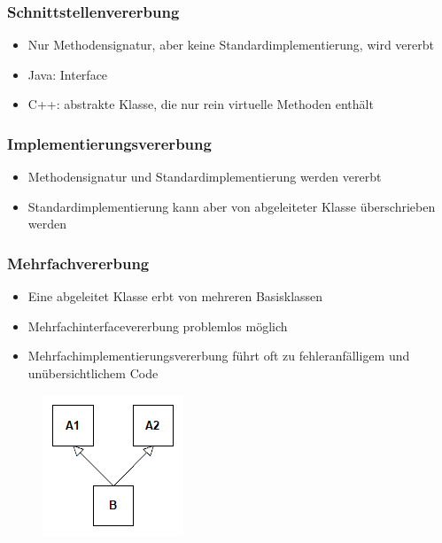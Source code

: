 \begin{frame}
	\frametitle{Schnittstellenvererbung}
	\begin{itemize}
		\item Nur Methodensignatur, aber keine Standardimplementierung, wird vererbt
		\item Java: Interface
		\item C++: abstrakte Klasse, die nur rein virtuelle Methoden enthält
	\end{itemize}
\end{frame}


\begin{frame}
	\frametitle{Implementierungsvererbung}
	\begin{itemize}
		\item Methodensignatur und Standardimplementierung werden vererbt
		\item Standardimplementierung kann aber von abgeleiteter Klasse überschrieben werden
	\end{itemize}
\end{frame}


\begin{frame}
	\frametitle{Mehrfachvererbung}
	\begin{itemize}
		\item Eine abgeleitet Klasse erbt von mehreren Basisklassen
		\item Mehrfachinterfacevererbung problemlos möglich
		\item Mehrfachimplementierungsvererbung führt oft zu fehleranfälligem und unübersichtlichem Code
	\end{itemize}
	\begin{figure}[H]
		\includegraphics[scale=0.75]{vererbung/mehrfach/mehrfach.png}
	\end{figure}
\end{frame}


